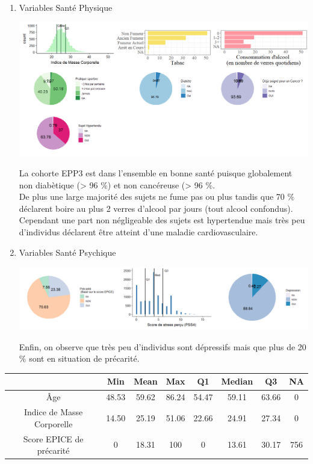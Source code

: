 \documentclass{book}
\begin{document}
\begin{enumerate}
\item Variables Santé Physique
\begin{center}
\includegraphics[scale=.45]{tab_var_sante_phys.png}
\end{center}
La cohorte EPP3 est dans l'ensemble en bonne santé puisque globalement non diabètique (> 96 $\%$) et non cancéreuse (> 96 $\%$.\\
De plus une large majorité des sujets ne fume pas ou plus tandis que 70 $\%$ déclarent boire au plus 2 verres d'alcool par jours (tout alcool confondus).\\
Cependant une part non négligeable des sujets est hypertendue mais très peu d'individus déclarent être atteint d'une maladie cardiovasculaire.\\
\item Variables Santé Psychique
\begin{center}
\includegraphics[scale=.45]{tab_var_sante_psy.png}
\end{center}
Enfin, on observe que très peu d'individus sont dépressifs mais que plus de 20 $\%$ sont en situation de précarité.
\end{enumerate}



\begin{center}
\setlength\arrayrulewidth{.6pt}
\begin{tabular}{|c|c|c|c|c|c|c|c|}
\hline
 & Min & Mean & Max & Q1 & Median & Q3 & NA \\
 \hline
 \hline
 Âge &  48.53 & 59.62 & 86.24 & 54.47 & 59.11 & 63.66 & 0\\
 \hline
 Indice de Masse Corporelle & 14.50 & 25.19 & 51.06 & 22.66 &  24.91 & 27.34 & 0\\
 \hline
 Score EPICE de précarité & 0 & 18.31 & 100 & 0 & 13.61 & 30.17 & 756\\
 \hline
\end{tabular}
\end{center}
\end{document}

